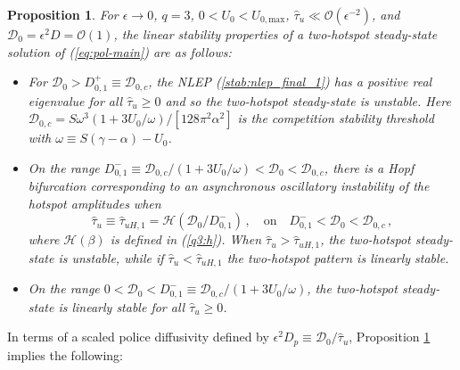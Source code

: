 \documentclass{article}%
\newtheorem{prop}[theorem]{Proposition}
\begin{document}
\begin{prop}\label{q3:main_twospots} For $\epsilon\to 0$, 
$q=3$, $0<U_0<U_{0,\textrm{max}}$, $\hat{\tau}_u\ll {\mathcal
    O}(\epsilon^{-2})$, and ${\mathcal D}_0=\epsilon^2 D = {\mathcal
    O}(1)$, the linear stability properties of a two-hotspot
  steady-state solution of (\ref{eq:pol-main}) are as follows:
\begin{itemize}
  \item For ${\mathcal D}_0>D^{+}_{0,1}\equiv {\mathcal D}_{0,c}$, the
    NLEP (\ref{stab:nlep_final_1}) has a positive real eigenvalue for
    all $\hat{\tau}_u\geq 0$ and so the two-hotspot steady-state is
    unstable. Here ${\mathcal D}_{0,c}={S\omega^3
      \left(1+{3U_0/\omega}\right)/[128\pi^2\alpha^2]}$ is the
    competition stability threshold with $\omega\equiv
    S(\gamma-\alpha)-U_0$.
 \item On the range $D^{-}_{0,1} \equiv {{\mathcal
      D}_{0,c}/\left(1+{3U_0/\omega}\right)} < {\mathcal D}_0
    <{\mathcal D}_{0,c}$, there is a Hopf bifurcation corresponding to an
   asynchronous oscillatory instability of the hotspot
    amplitudes when 
\begin{equation}\label{q3:2osc}
 \hat{\tau}_{u}\equiv \hat{\tau}_{uH,1}= {\mathcal H}\left({{\mathcal
     D}_0/D^{-}_{0,1}}\right) \,, \quad \mbox{on} \quad
 D^{-}_{0,1}<{\mathcal D}_0 <{\mathcal D}_{0,c} \,,
\end{equation}
where ${\mathcal H}(\beta)$ is defined in (\ref{q3:h}).  When
$\hat{\tau}_u>\hat{\tau}_{uH,1}$, the two-hotspot steady-state is
unstable, while if $\hat{\tau}_u<\hat{\tau}_{uH,1}$ the two-hotspot
pattern is linearly stable.
\item On the range $0<{\mathcal D}_0 < D^{-}_{0,1} \equiv {{\mathcal
    D}_{0,c}/\left(1+{3U_0/\omega}\right)}$, the two-hotspot
  steady-state is linearly stable for all $\hat{\tau}_u\geq 0$.
\end{itemize}
\end{prop}

\noindent In terms of a scaled police diffusivity defined by 
$\epsilon^2 D_p\equiv {{\mathcal D}_0/\hat{\tau}_u}$, Proposition
\ref{q3:main_twospots} implies the following:
\end{document}
